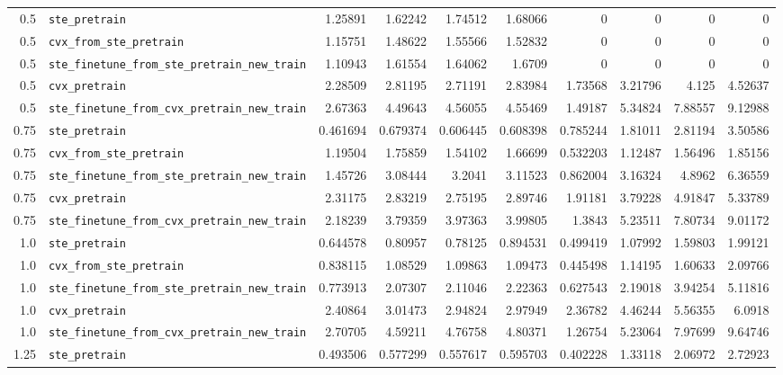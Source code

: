 \begin{longtable}{@{}r l *{8}{r}@{}}
0.5 & \texttt{ste\_pretrain} & 1.25891 & 1.62242 & 1.74512 & 1.68066 & 0 & 0 & 0 & 0 \\
0.5 & \texttt{cvx\_from\_ste\_pretrain} & 1.15751 & 1.48622 & 1.55566 & 1.52832 & 0 & 0 & 0 & 0 \\
0.5 & \texttt{ste\_finetune\_from\_ste\_pretrain\_new\_train} & 1.10943 & 1.61554 & 1.64062 & 1.6709 & 0 & 0 & 0 & 0 \\
0.5 & \texttt{cvx\_pretrain} & 2.28509 & 2.81195 & 2.71191 & 2.83984 & 1.73568 & 3.21796 & 4.125 & 4.52637 \\
0.5 & \texttt{ste\_finetune\_from\_cvx\_pretrain\_new\_train} & 2.67363 & 4.49643 & 4.56055 & 4.55469 & 1.49187 & 5.34824 & 7.88557 & 9.12988 \\
0.75 & \texttt{ste\_pretrain} & 0.461694 & 0.679374 & 0.606445 & 0.608398 & 0.785244 & 1.81011 & 2.81194 & 3.50586 \\
0.75 & \texttt{cvx\_from\_ste\_pretrain} & 1.19504 & 1.75859 & 1.54102 & 1.66699 & 0.532203 & 1.12487 & 1.56496 & 1.85156 \\
0.75 & \texttt{ste\_finetune\_from\_ste\_pretrain\_new\_train} & 1.45726 & 3.08444 & 3.2041 & 3.11523 & 0.862004 & 3.16324 & 4.8962 & 6.36559 \\
0.75 & \texttt{cvx\_pretrain} & 2.31175 & 2.83219 & 2.75195 & 2.89746 & 1.91181 & 3.79228 & 4.91847 & 5.33789 \\
0.75 & \texttt{ste\_finetune\_from\_cvx\_pretrain\_new\_train} & 2.18239 & 3.79359 & 3.97363 & 3.99805 & 1.3843 & 5.23511 & 7.80734 & 9.01172 \\
1.0 & \texttt{ste\_pretrain} & 0.644578 & 0.80957 & 0.78125 & 0.894531 & 0.499419 & 1.07992 & 1.59803 & 1.99121 \\
1.0 & \texttt{cvx\_from\_ste\_pretrain} & 0.838115 & 1.08529 & 1.09863 & 1.09473 & 0.445498 & 1.14195 & 1.60633 & 2.09766 \\
1.0 & \texttt{ste\_finetune\_from\_ste\_pretrain\_new\_train} & 0.773913 & 2.07307 & 2.11046 & 2.22363 & 0.627543 & 2.19018 & 3.94254 & 5.11816 \\
1.0 & \texttt{cvx\_pretrain} & 2.40864 & 3.01473 & 2.94824 & 2.97949 & 2.36782 & 4.46244 & 5.56355 & 6.0918 \\
1.0 & \texttt{ste\_finetune\_from\_cvx\_pretrain\_new\_train} & 2.70705 & 4.59211 & 4.76758 & 4.80371 & 1.26754 & 5.23064 & 7.97699 & 9.64746 \\
1.25 & \texttt{ste\_pretrain} & 0.493506 & 0.577299 & 0.557617 & 0.595703 & 0.402228 & 1.33118 & 2.06972 & 2.72923 \\

\end{longtable}
